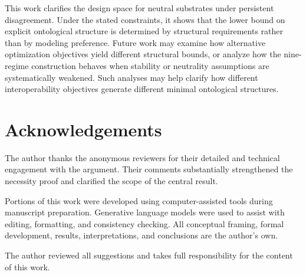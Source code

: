 This work clarifies the design space for neutral substrates under persistent
disagreement.
Under the stated constraints, it shows that the
lower bound on explicit ontological structure is determined by structural
requirements rather than by modeling preference.
Future work may examine how alternative optimization objectives
yield different structural bounds,
or analyze how the nine-regime construction behaves
when stability or neutrality assumptions are systematically weakened.
Such analyses may help clarify how different interoperability
objectives generate different minimal ontological structures.


\section*{Acknowledgements}

The author thanks the anonymous reviewers for their detailed and
technical engagement with the argument.
Their comments substantially strengthened the necessity proof
and clarified the scope of the central result.

Portions of this work were developed
using computer-assisted tools during manuscript preparation.
Generative language models were used to assist with editing, formatting,
and consistency checking.
All conceptual framing, formal development, results, interpretations, and conclusions
are the author's own.

The author reviewed all suggestions and
takes full responsibility for the content of this work.
